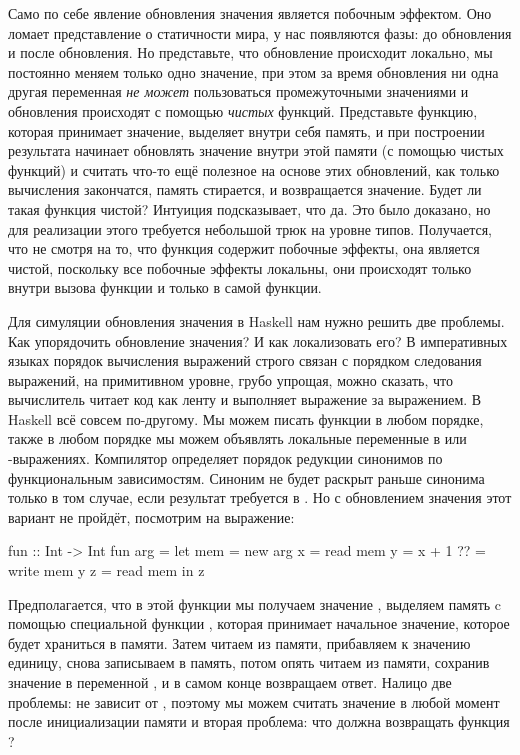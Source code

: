 Само по себе явление обновления значения является побочным эффектом. Оно
ломает представление о статичности мира, у нас появляются фазы: до
обновления и после обновления. Но представьте, что обновление происходит
локально, мы постоянно меняем только одно значение, при этом за время
обновления ни одна другая переменная \emph{не может} пользоваться
промежуточными значениями и обновления происходят с помощью
\emph{чистых} функций. Представьте функцию, которая принимает значение,
выделяет внутри себя память, и при построении результата начинает
обновлять значение внутри этой памяти (с помощью чистых функций) и
считать что-то ещё полезное на основе этих обновлений, как только
вычисления закончатся, память стирается, и возвращается значение. Будет
ли такая функция чистой? Интуиция подсказывает, что да. Это было
доказано, но для реализации этого требуется небольшой трюк на уровне
типов. Получается, что не смотря на то, что функция содержит побочные
эффекты, она является чистой, поскольку все побочные эффекты локальны,
они происходят только внутри вызова функции и только в самой функции.

Для симуляции обновления значения в Haskell нам нужно решить две
проблемы. Как упорядочить обновление значения? И как локализовать его? В
императивных языках порядок вычисления выражений строго связан с
порядком следования выражений, на примитивном уровне, грубо упрощая,
можно сказать, что вычислитель читает код как ленту и выполняет
выражение за выражением. В Haskell всё совсем по-другому. Мы можем
писать функции в любом порядке, также в любом порядке мы можем объявлять
локальные переменные в  или -выражениях. Компилятор
определяет порядок редукции синонимов по функциональным зависимостям.
Синоним  не будет раскрыт раньше синонима  только в том
случае, если результат  требуется в . Но с обновлением
значения этот вариант не пройдёт, посмотрим на выражение:


\begin{code}
fun :: Int -> Int
fun arg = 
    let mem = new arg
        x   = read mem
        y   = x + 1
        ??  = write mem y
        z   = read mem
    in z
\end{code}

Предполагается, что в этой функции мы получаем значение ,
выделяем память  c помощью специальной функции , которая
принимает начальное значение, которое будет храниться в памяти. Затем
читаем из памяти, прибавляем к значению единицу, снова записываем в
память, потом опять читаем из памяти, сохранив значение в переменной
, и в самом конце возвращаем ответ. Налицо две проблемы:  не
зависит от , поэтому мы можем считать значение  в любой
момент после инициализации памяти и вторая проблема: что должна
возвращать функция ?

